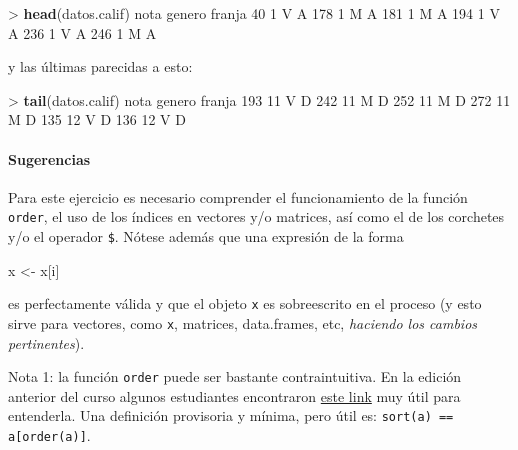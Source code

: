 \documentclass[]{article}
\newenvironment{Shaded}{}{}
\newcommand{\KeywordTok}[1]{\textcolor[rgb]{0.00,0.44,0.13}{\textbf{{#1}}}}
\newcommand{\DecValTok}[1]{\textcolor[rgb]{0.25,0.63,0.44}{{#1}}}
\newcommand{\NormalTok}[1]{{#1}}
\begin{document}
\begin{Shaded}
\begin{Highlighting}[]
\NormalTok{> }\KeywordTok{head}\NormalTok{(datos.calif)}
    \NormalTok{nota genero franja}
\DecValTok{40}     \DecValTok{1}      \NormalTok{V      A}
\DecValTok{178}    \DecValTok{1}      \NormalTok{M      A}
\DecValTok{181}    \DecValTok{1}      \NormalTok{M      A}
\DecValTok{194}    \DecValTok{1}      \NormalTok{V      A}
\DecValTok{236}    \DecValTok{1}      \NormalTok{V      A}
\DecValTok{246}    \DecValTok{1}      \NormalTok{M      A}
\end{Highlighting}
\end{Shaded}
y las últimas parecidas a esto:

\begin{Shaded}
\begin{Highlighting}[]
\NormalTok{> }\KeywordTok{tail}\NormalTok{(datos.calif)}
    \NormalTok{nota genero franja}
\DecValTok{193}   \DecValTok{11}      \NormalTok{V      D}
\DecValTok{242}   \DecValTok{11}      \NormalTok{M      D}
\DecValTok{252}   \DecValTok{11}      \NormalTok{M      D}
\DecValTok{272}   \DecValTok{11}      \NormalTok{M      D}
\DecValTok{135}   \DecValTok{12}      \NormalTok{V      D}
\DecValTok{136}   \DecValTok{12}      \NormalTok{V      D}
\end{Highlighting}
\end{Shaded}
\paragraph{Sugerencias}

Para este ejercicio es necesario comprender el funcionamiento de la
función \texttt{order}, el uso de los índices en vectores y/o matrices,
así como el de los corchetes y/o el operador \texttt{\$}. Nótese además
que una expresión de la forma

\begin{Shaded}
\begin{Highlighting}[]
\NormalTok{x <- x[i]}
\end{Highlighting}
\end{Shaded}
es perfectamente válida y que el objeto \texttt{x} es sobreescrito en el
proceso (y esto sirve para vectores, como \texttt{x}, matrices,
data.frames, etc, \emph{haciendo los cambios pertinentes}).

Nota 1: la función \texttt{order} puede ser bastante contraintuitiva. En
la edición anterior del curso algunos estudiantes encontraron
\href{http://stackoverflow.com/questions/2315601/understanding-the-order-function-in-r}{este
link} muy útil para entenderla. Una definición provisoria y mínima, pero
útil es: \texttt{sort(a) == a{[}order(a){]}}.
\end{document}
